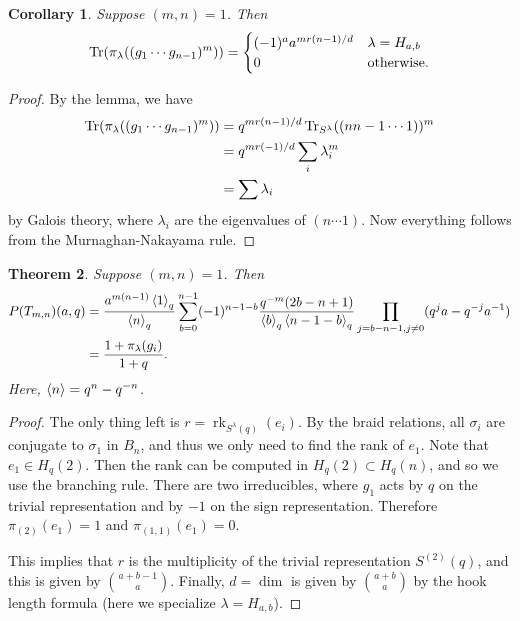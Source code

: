 \documentclass[leqno, openany]{memoir}
\newtheorem{thm}{Theorem}[section]
\newtheorem{cor}[thm]{Corollary}
\theoremstyle{definition}
\theoremstyle{remark}
\theoremstyle{plain}
\theoremstyle{definition}
\theoremstyle{remark}
\newcommand{\mr}[1]{\mathrm{#1}}
\newcommand{\on}[1]{\operatorname{#1}}
\newcommand{\1}{\mathbf{1}}
\newcommand{\2}{\mathbf{2}}
\newcommand{\3}{\mathbf{3}}
\begin{document}
\begin{cor}
    Suppose $(m,n) = 1$. Then 
    \[ \Tr(\pi_{\lambda}((g_1 \cdots g_{n-1})^m)) = \begin{cases}
        (-1)^a a^{m r(n-1)/d} & \lambda = H_{a,b} \\
        0 & \text{otherwise}.
    \end{cases} \]
\end{cor}

\begin{proof}
    By the lemma, we have
    \begin{align*}
        \mr{Tr}(\pi_{\lambda}((g_1 \cdots g_{n-1})^m)) &= q^{mr(n-1)/d} \Tr_{S^{\lambda}}((n n-1 \cdots 1))^m \\
        &= q^{mr(-1)/d} \sum_i \lambda_i^m \\
        &= \sum \lambda_i
    \end{align*}
    by Galois theory, where $\lambda_i$ are the eigenvalues of $(n \cdots 1)$. Now everything follows from the Murnaghan-Nakayama rule.
\end{proof}

\begin{thm}
    Suppose $(m,n) = 1$. Then 
    \begin{align*} 
        P(T_{m,n})(a,q) &= \frac{a^{m(n-1)} \ev{1}_q}{\ev{n}_q} \sum_{b=0}^{n-1} (-1)^{n-1-b} \frac{q^{-m}(2b-n+1)}{\ev{b}_q \ev{n-1-b}_q} \prod_{j=b-n-1,j \neq 0} (q^j a - q^{-j} a^{-1}) \\
        &= \frac{1 + \pi_{\lambda}(g_i)}{1+q}.
    \end{align*}
    Here, $\ev{n} = q^n - q^{-n}$.
\end{thm}

\begin{proof}
    The only thing left is $r = \on{rk}_{S^{\lambda}(q)}(e_i)$. By the braid relations, all $\sigma_i$ are conjugate to $\sigma_1$ in $B_n$, and thus we only need to find the rank of $e_1$. Note that $e_1 \in H_q(2)$. Then the rank can be computed in $H_q(2) \subset H_q(n)$, and so we use the branching rule. There are two irreducibles, where $g_1$ acts by $q$ on the trivial representation and by $-1$ on the sign representation. Therefore $\pi_{(2)}(e_1) = 1$ and $\pi_{(1,1)}(e_1) = 0$.

    This implies that $r$ is the multiplicity of the trivial representation $S^{(2)}(q)$, and this is given by $\binom{a+b-1}{a}$. Finally, $d = \dim$ is given by $\binom{a+b}{a}$ by the hook length formula (here we specialize $\lambda = H_{a,b}$).
\end{proof}
\end{document}
